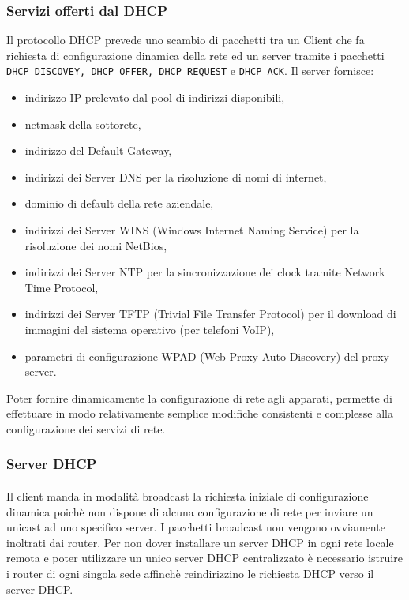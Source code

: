 \subsubsection{Servizi offerti dal DHCP} 
Il protocollo DHCP prevede uno scambio di pacchetti tra un Client che fa richiesta di configurazione dinamica della rete ed un server tramite i pacchetti {\tt DHCP DISCOVEY, DHCP OFFER, DHCP REQUEST} e {\tt DHCP ACK}. Il server fornisce:
\begin{itemize}
	\item indirizzo IP prelevato dal pool di indirizzi disponibili,
	\item netmask della sottorete,
	\item indirizzo del Default Gateway,
	\item indirizzi dei Server DNS per la risoluzione di nomi di internet,
	\item dominio di default della rete aziendale,
	\item indirizzi dei Server WINS (Windows Internet Naming Service) per la risoluzione dei nomi NetBios,
	\item indirizzi dei Server NTP per la sincronizzazione dei clock tramite Network Time Protocol,
	\item indirizzi dei Server TFTP (Trivial File Transfer Protocol) per il download di immagini del sistema operativo (per telefoni VoIP),
	\item parametri di configurazione WPAD (Web Proxy Auto Discovery) del proxy server. 
\end{itemize}
Poter fornire dinamicamente la configurazione di rete agli apparati, permette di effettuare in modo relativamente semplice modifiche consistenti e complesse alla configurazione dei servizi di rete.

\subsubsection{Server DHCP} 
\paragraph{} Il client manda in modalità broadcast la richiesta iniziale di configurazione dinamica poichè non dispone di alcuna configurazione di rete per inviare un unicast ad uno specifico server. I pacchetti broadcast non vengono ovviamente inoltrati dai router. Per non dover installare un server DHCP in ogni rete locale remota e poter utilizzare un unico server DHCP centralizzato è necessario istruire i router di ogni singola sede affinchè reindirizzino le richiesta DHCP verso il server DHCP. 
